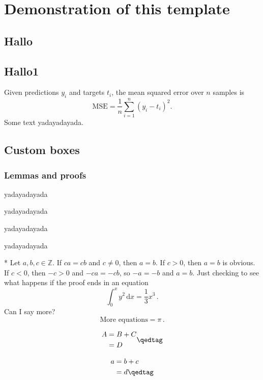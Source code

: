 \section{Demonstration of this template}

\subsection*{Hallo}
\subsection{Hallo1}

Given predictions $y_i$ and targets $t_i$, the mean squared error over $n$ samples is
\begin{equation}\label{eq:mse}
  \mathrm{MSE}=\frac{1}{n}\sum_{i=1}^n (y_i-t_i)^2.
\end{equation}
Some text yadayadayada.

\subsection{Custom boxes}
\subsubsection{Lemmas and proofs}

yadayadayada

yadayadayada

yadayadayada

yadayadayada

\begin{nicelemma}* \label{lem:whatever}
    Let $a,b,c\in\mathbb{Z}$. If $ca = cb$ and $c\neq 0$, then $a = b$.
    \nextpart[Example.]
    If $c > 0$, then $a = b$ is obvious. If $c < 0$, then $-c > 0$ and $-ca = -cb$, so $-a = -b$ and $a = b$.
    Just checking to see what happens if the proof ends in an equation
    \[
        \int_0^x y^2 \,\mathrm{d}x = \frac{1}{3} x^3 \,. 
    \]
    Can I say more?
    \[
    \text{More equations} = \pi \,. 
    \]

    \begin{equation}
    \begin{split}
      A &= B + C\\
        &= D 
    \end{split}\qedtag
    \end{equation}

    \begin{align}
      a &= b + c \\
        &= d \qedtag
    \end{align}
\end{nicelemma}

